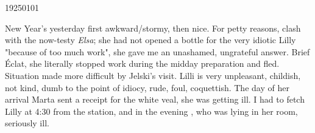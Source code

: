 \begin{entry}{19250101}
	\begin{header}
		\date{January 1st, Thursday morning. 1925.}
	\end{header}
	New Year's yesterday first awkward/stormy, then nice. For petty reasons, clash with the now-testy \textit{Elsa}; she had not opened a bottle for the very idiotic Lilly "because of too much work", she gave me an unashamed, ungrateful answer. Brief Éclat, she literally stopped work during the midday preparation and fled.
	Situation made more difficult by Jelski's visit. Lilli is very unpleasant, childish, not kind, dumb to the point of idiocy, rude, foul, coquettish. The day of her arrival Marta sent a receipt for the white veal, she was getting ill. I had to fetch Lilly at 4:30 from the station, and in the evening , who was lying in her room, seriously ill.
	
	
\end{entry}
